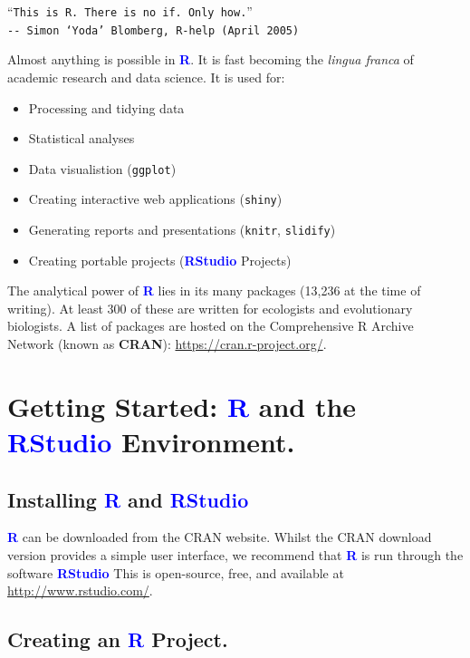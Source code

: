 \documentclass[a4paper,12pt]{article}
\newcommand\boldblue[1]{\textcolor{blue}{\textbf{#1}}}
\begin{document}
\begin{center}
``\texttt{This is R. There is no if. Only how.}'' \\
\texttt{{-}{-} Simon `Yoda' Blomberg, R-help (April 2005)}

\end{center}


Almost anything is possible in \boldblue{R}. It is fast becoming the \textit{lingua franca} of academic research and data science. It is used for:

\begin{itemize}
\item Processing and tidying data 
\item Statistical analyses
\item Data visualistion (\texttt{ggplot})
\item Creating interactive web applications (\texttt{shiny})
\item Generating reports and presentations (\texttt{knitr}, \texttt{slidify})
\item Creating portable projects (\boldblue{RStudio} Projects)
\end{itemize}

The analytical power of \boldblue{R} lies in its many packages (13,236 at the time of writing). At least 300 of these are written for ecologists and evolutionary biologists. A list of packages are hosted on the Comprehensive R Archive Network (known as \textbf{CRAN}): \url{https://cran.r-project.org/}.


\section {Getting Started: \boldblue{R} and the \boldblue{RStudio} Environment.}
\subsection {Installing \boldblue{R} and \boldblue{RStudio}}

\boldblue{R} can be downloaded from the CRAN website. Whilst the CRAN download version provides a simple user interface, we recommend that \boldblue{R} is run through the software \boldblue{RStudio} This is open-source, free, and available at \url{http://www.rstudio.com/}.


\subsection {Creating an \boldblue{R} Project.}
\end{document}

